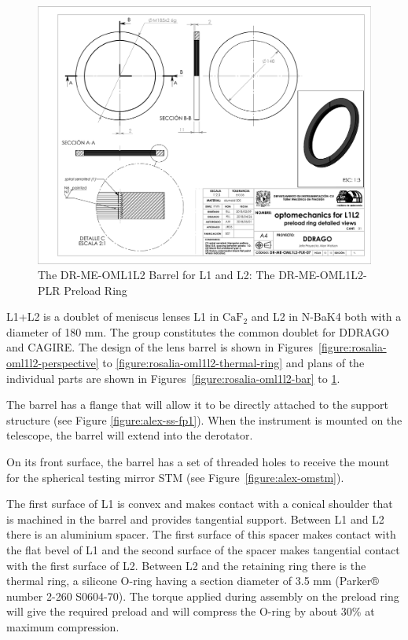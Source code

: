 \documentclass{article}
\newcommand{\CaF}{\ensuremath{\mathrm{CaF_2}}}
\begin{document}
\begin{figure}
\begin{center}
\includegraphics[height=\linewidth,angle=90]{figures/DR-ME-OML1L2-PLR-07}
\end{center}
\caption{The DR-ME-OML1L2 Barrel for L1 and L2: The DR-ME-OML1L2-PLR Preload Ring}
\label{figure:rosalia-oml1l2-plr}
\end{figure}

L1+L2 is a doublet of meniscus lenses L1 in {\CaF} and L2 in N-BaK4 both with a diameter of 180 mm. The group constitutes the common doublet for DDRAGO and CAGIRE. The design of the lens barrel is shown in Figures~\ref{figure:rosalia-oml1l2-perspective} to \ref{figure:rosalia-oml1l2-thermal-ring} and plans of the individual parts are shown in Figures~\ref{figure:rosalia-oml1l2-bar} to \ref{figure:rosalia-oml1l2-plr}.

The barrel has a flange that will allow it to be directly attached to the support structure (see Figure \ref{figure:alex-ss-fp1}). When the instrument is mounted on the telescope, the barrel will extend into the derotator. 

On its front surface, the barrel has a set of threaded holes to receive the mount for the spherical testing mirror STM (see Figure~\ref{figure:alex-omstm}).

The first surface of L1 is convex and makes contact with a conical shoulder that is machined in the barrel and provides tangential support. Between L1 and L2 there is an aluminium spacer. The first surface of this spacer makes contact with the flat bevel of L1 and the second surface of the spacer makes tangential contact with the first surface of L2. Between L2 and the retaining ring there is the thermal ring, a silicone O-ring having a section diameter of 3.5 mm (Parker® number 2-260 S0604-70). The torque applied during assembly on the preload ring will give the required preload and will compress the O-ring by about 30\% at maximum compression. 
\end{document}
